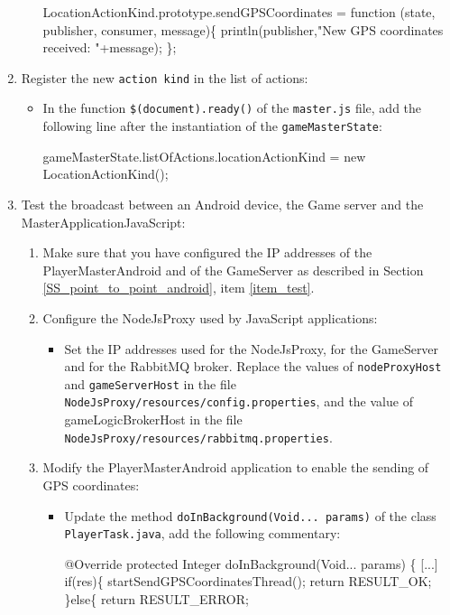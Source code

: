 \begin{enumerate}
\begin{itemize}
\begin{shellcmd}
LocationActionKind.prototype.sendGPSCoordinates = function (state, publisher, 
                                                            consumer, message)\{
        println(publisher,"New GPS coordinates received: "+message);
\};
\end{shellcmd}
\end{itemize}
\item Register the new \texttt{action kind} in the list of actions:
\begin{itemize}
\item In the function \texttt{\$(document).ready()} of the
  \texttt{master.js} file, add the following line after the
  instantiation of the \texttt{gameMasterState}:
\begin{shellcmd}
gameMasterState.listOfActions.locationActionKind = new LocationActionKind(); 
\end{shellcmd}
\end{itemize}
\item Test the broadcast between an Android device, the Game 
server and the MasterApplicationJavaScript:
\begin{enumerate}
\item Make sure that you have configured the IP addresses of the
  PlayerMasterAndroid and of the GameServer as described in Section
  \ref{SS_point_to_point_android}, item \ref{item_test}.
\item Configure the NodeJsProxy used by JavaScript applications:
\begin{itemize}
\item Set the IP addresses used for the NodeJsProxy, for the
  GameServer and for the RabbitMQ broker. Replace the values of
  \texttt{nodeProxyHost} and \texttt{gameServerHost} in the file
  \texttt{NodeJsProxy/resources/config.properties}, and the value of
  gameLogicBrokerHost in the file
  \texttt{NodeJsProxy/resources/rabbitmq.properties}.
\end{itemize}
\item Modify the PlayerMasterAndroid application to enable the sending of GPS coordinates:
\begin{itemize}
\item Update the method \texttt{doInBackground(Void... params)} of the
  class \texttt{PlayerTask.java}, add the following commentary:
\begin{shellcmd}
@Override
protected Integer doInBackground(Void... params) \{
    [...]
    if(res)\{
        startSendGPSCoordinatesThread();
        return RESULT_OK;
    \}else\{
        return RESULT_ERROR;

\end{shellcmd}
\end{itemize}
\end{enumerate}
\end{enumerate}
